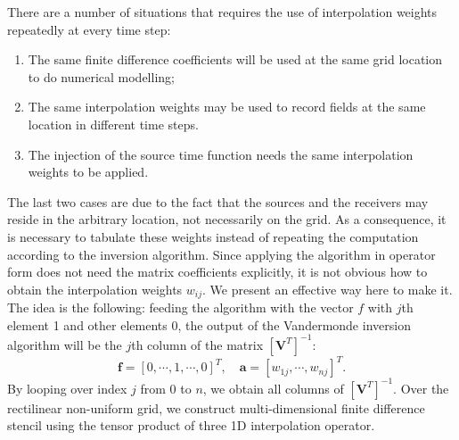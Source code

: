 \documentclass[a4paper,10pt]{article}
\begin{document}
There are a number of situations that requires the use of interpolation weights repeatedly at every time step:
\begin{enumerate}
\item The same finite difference coefficients will be used at the same grid location to do numerical modelling;
\item The same interpolation weights may be used to record fields at the same location in different time steps.
\item The injection of the source time function needs the same interpolation weights to be applied.
\end{enumerate}
The last two cases are due to the fact that the sources and the receivers may reside in the arbitrary location, not necessarily on the grid. As a consequence, it is necessary to tabulate these weights instead of repeating the computation according to the inversion algorithm. Since applying the algorithm in operator form does not need the matrix coefficients explicitly, it is not obvious how to obtain the interpolation weights $w_{ij}$. We present an effective way here to make it. The idea is the following: feeding the algorithm with the vector $f$ with $j$th element 1 and other elements 0, the output of the Vandermonde inversion algorithm will be the $j$th column of the matrix $[\mathbf{V}^T]^{-1}$:
\begin{equation}
  \mathbf{f}=[0,\cdots,1,\cdots,0]^T, \quad \mathbf{a} = [w_{1j},\cdots,w_{nj}]^T.
\end{equation}
By looping over index $j$ from 0 to $n$, we obtain all columns of $[\mathbf{V}^{T}]^{-1}$. Over the rectilinear non-uniform grid, we construct multi-dimensional finite difference stencil using the tensor product of three 1D interpolation operator.
\end{document}
